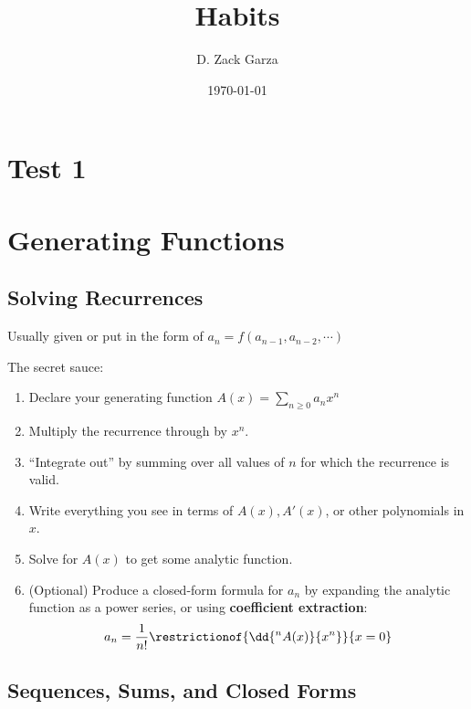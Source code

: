 

\title{
\textbf{
    Habits
  }
  }
\author{D. Zack Garza}
\date{\today}



\maketitle
\tableofcontents


\hypertarget{test-1}{%
\section{Test 1}\label{test-1}}

\hypertarget{generating-functions}{%
\section{Generating Functions}\label{generating-functions}}

\hypertarget{solving-recurrences}{%
\subsection{Solving Recurrences}\label{solving-recurrences}}

Usually given or put in the form of
\(a_n = f(a_{n-1}, a_{n-2}, \cdots)\)

The secret sauce:

\begin{enumerate}
\def\labelenumi{\arabic{enumi}.}
\tightlist
\item
  Declare your generating function
  \(A(x) = \displaystyle\sum_{n\geq 0} a_n x^n\)
\item
  Multiply the recurrence through by \(x^n\).
\item
  ``Integrate out'' by summing over all values of \(n\) for which the
  recurrence is valid.
\item
  Write everything you see in terms of \(A(x), A'(x)\), or other
  polynomials in \(x\).
\item
  Solve for \(A(x)\) to get some analytic function.
\item
  (Optional) Produce a closed-form formula for \(a_n\) by expanding the
  analytic function as a power series, or using \textbf{coefficient
  extraction}: \[
  a_n = \frac{1}{n!} \restrictionof{\dd{^n A(x)}{x^n}}{x=0}
  \]
\end{enumerate}

\hypertarget{sequences-sums-and-closed-forms}{%
\subsection{Sequences, Sums, and Closed
Forms}\label{sequences-sums-and-closed-forms}}

